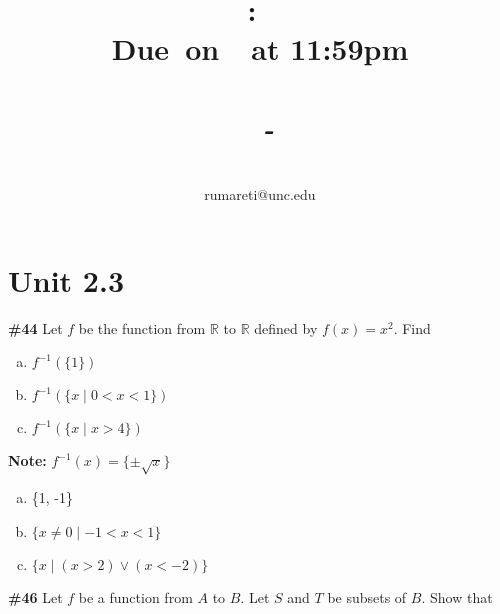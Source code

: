 \documentclass{article}
\title{
    \vspace{2in}
    \textmd{\textbf{\hmwkClass:\ \hmwkTitle}}\\
    \normalsize\vspace{0.1in}\small{\textbf{Due\ on\ \hmwkDueDate\ at 11:59pm}}\\
    \normalsize\text{Tuesday/Thursday 11:00-12:15, Phillips 383}\\
    \vspace{0.1in}\large{\textit{\hmwkClassInstructor\ - \hmwkClassTime}}
    \vspace{3in}
}
\author{\hmwkAuthorName\\\small{rumareti@unc.edu}}
\date{}
\newcommand{\unit}[1]{\section{Unit #1}}
\newcommand{\problem}[1]{\textbf{\##1}}
\newcommand{\prob}[1]{\problem{#1}}
\newcommand{\Or}{\vee}
\newcommand{\AllReals}{\mathbb{R}}
\begin{document}
\maketitle


\pagebreak

\unit{2.3}
\prob{44}
Let \(f\) be the function from \(\AllReals\) to \(\AllReals\) defined by
\(f(x) = x^2\). Find

\begin{enumerate}[a)]
    \item \(f^{-1}(\{1\})\)
    \item \(f^{-1}(\{x \mid 0 < x < 1\})\)
    \item \(f^{-1}(\{x \mid x > 4\})\)
\end{enumerate}
\textbf{Note: } \(f^{-1}(x) = \{\pm\sqrt{x}\}\)
\begin{enumerate}[a)]
    \item \{1, -1\}
    \item \(\{x \neq 0 \mid -1 < x < 1\}\)
    \item \(\{x \mid (x > 2) \Or (x < -2)\}\)
\end{enumerate}

\pagebreak

\prob{46}
Let \(f\) be a function from \(A\) to \(B\). Let \(S\) and \(T\) be subsets of \(B\). Show that
\end{document}
